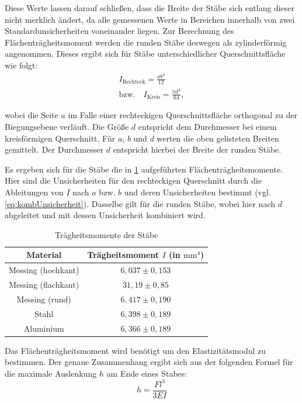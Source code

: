 	Diese Werte lassen darauf schließen, dass die Breite der Stäbe sich entlang dieser nicht merklich ändert, da alle gemessenen Werte in Bereichen innerhalb von zwei Standardunsicherheiten voneinander liegen.
	Zur Berechnung des Flächenträgheitsmoment werden die runden Stäbe deswegen als zylinderförmig angenommen.
	Dieses ergibt sich für Stäbe unterschiedlicher Querschnittsfläche wie folgt:
	\begin{align*}
	I_\text{Rechteck} = \frac{ab^3}{12} \\
	\text{bzw.} \quad I_\text{Kreis} =\frac{\pi d^4}{64}, 
	\end{align*}
	
	wobei die Seite $a$ im Falle einer rechteckigen Querschnittsfläche orthogonal zu der Biegungsebene verläuft. Die Größe $d$ entspricht dem Durchmesser bei einem kreisförmigen Querschnitt. Für $a$, $b$ und $d$ werten die oben gelisteten Breiten gemittelt. Der Durchmesser $d$ entspricht hierbei der Breite der runden Stäbe.
	
	Es ergeben sich für die Stäbe die in \cref{tab:Trägheitsmomente} aufgeführten Flächenträgheitsmomente. Hier sind die Unsicherheiten für den rechteckigen Querschnitt durch die Ableitungen von $I$ nach $a$ bzw. $b$ und deren Unsicherheiten bestimmt (vgl. \cref{eq:kombUnsicherheit}). Dasselbe gilt für die runden Stäbe, wobei hier nach $d$ abgeleitet und mit dessen Unsicherheit kombiniert wird.
	\begin{table}[ht]
		\caption{Trägheitsmomente der Stäbe}
		\centering
		\label{tab:Trägheitsmomente}
		\begin{tabular}{c|c}
			{Material} & {Trägheitsmoment $I$ (in $\text{mm}^4$)}\\ %
			\hline
			{Messing (hochkant)} & {$6,037\pm 0,153$}\\
			{Messing (flachkant)} & {$31,19\pm 0,85$}\\
			{Messing (rund)} & {$6,417\pm 0,190$}\\
			{Stahl} & {$6,398\pm 0,189$} \\
			{Aluminium} & {$6,366\pm 0,189$}\\	
		\end{tabular}
	\end{table}
	Das Flächenträgheitsmoment wird benötigt um den Elastizitätsmodul zu bestimmen. Der genaue Zusammenhang ergibt sich aus der folgenden Formel für die maximale Auslenkung $h$ am Ende eines Stabes:
	\begin{equation}
	h = \frac{Fl^3}{3EI} 
	\end{equation}
	
